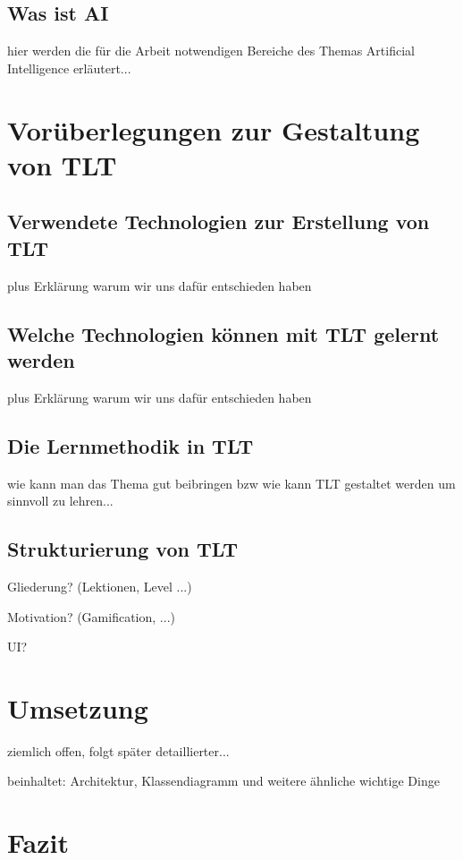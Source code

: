 \subsection{Was ist AI}

hier werden die für die Arbeit notwendigen Bereiche des Themas Artificial Intelligence erläutert...

\section{Vorüberlegungen zur Gestaltung von TLT}

\subsection{Verwendete Technologien zur Erstellung von TLT}

plus Erklärung warum wir uns dafür entschieden haben

\subsection{Welche Technologien können mit TLT gelernt werden}
\label{lernbareTechnologien}

plus Erklärung warum wir uns dafür entschieden haben

\subsection{Die Lernmethodik in TLT}

wie kann man das Thema gut beibringen bzw wie kann TLT gestaltet werden um sinnvoll zu lehren...

\subsection{Strukturierung von TLT}

Gliederung? (Lektionen, Level ...)

Motivation? (Gamification, ...)

UI?

\section{Umsetzung}

ziemlich offen, folgt später detaillierter...

beinhaltet: Architektur, Klassendiagramm und weitere ähnliche wichtige Dinge

\section{Fazit}


